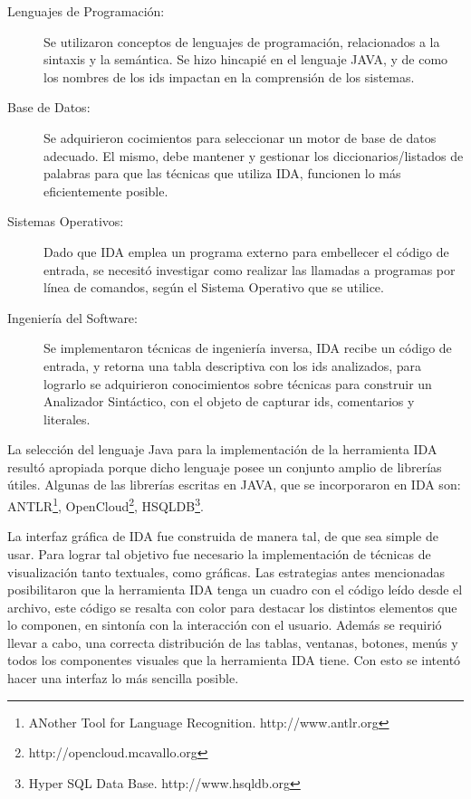 \begin{description}

\item[Lenguajes de Programación:] Se utilizaron conceptos de lenguajes de programación, relacionados a la sintaxis y la semántica. Se hizo hincapié en el lenguaje JAVA, y de como los nombres de los ids impactan en la comprensión de los sistemas.

\item[Base de Datos:] Se adquirieron cocimientos para seleccionar un motor de base de datos adecuado. El mismo, debe mantener y gestionar los diccionarios/listados de palabras para que las técnicas que utiliza IDA, funcionen lo más eficientemente posible.

\item[Sistemas Operativos:] Dado que IDA emplea un programa externo para embellecer el código de entrada, se necesitó investigar como realizar las llamadas a programas por línea de comandos, según el Sistema Operativo que se utilice.


\item[Ingeniería del Software:] Se implementaron técnicas de ingeniería inversa, IDA recibe un código de entrada, y retorna una tabla descriptiva con los ids analizados, para lograrlo se adquirieron conocimientos sobre técnicas para construir un Analizador Sintáctico, con el objeto de capturar ids, comentarios y literales.

\end{description}

La selección del lenguaje Java para la implementación de la herramienta IDA resultó apropiada porque dicho lenguaje posee un conjunto amplio de librerías útiles. Algunas de las librerías escritas en JAVA, que se incorporaron en IDA son: ANTLR\footnote[1]{ANother Tool for Language Recognition. http://www.antlr.org}, OpenCloud\footnote[2]{http://opencloud.mcavallo.org}, HSQLDB\footnote[3]{Hyper SQL Data Base. http://www.hsqldb.org}.

La interfaz gráfica de IDA fue construida de manera tal, de que sea simple de usar. Para lograr tal objetivo fue necesario la implementación de técnicas de visualización tanto textuales, como gráficas. Las estrategias antes mencionadas posibilitaron que la herramienta IDA tenga un cuadro con el código leído desde el archivo, este código se resalta con color para destacar los distintos elementos que lo componen, en sintonía con la interacción con el usuario. Además se requirió llevar a cabo, una correcta distribución de las tablas, ventanas, botones, menús y todos los componentes visuales que la herramienta IDA tiene. Con esto se intentó hacer una interfaz lo más sencilla posible.


